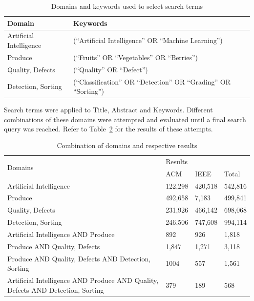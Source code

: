 \documentclass[conference]{IEEEtran}
\begin{document}
\begin{table}
	\caption{Domains and keywords used to select search terms}
	\label{tab:resdom}

	\begin{tabular}{ll}
	\hline
		Domain & Keywords \\
	\hline
		Artificial Intelligence & (``Artificial Intelligence'' OR ``Machine Learning'') \\
		Produce & (``Fruits'' OR ``Vegetables'' OR ``Berries'') \\
		Quality, Defects & (``Quality'' OR ``Defect'') \\
		Detection, Sorting & (``Classification'' OR ``Detection'' OR ``Grading'' OR ``Sorting'') \\
	\hline
	\end{tabular}
\end{table}

Search terms were applied to Title, Abstract and Keywords. Different combinations of these domains were attempted and evaluated until a final search query was reached. Refer to Table~\ref{tab:resres} for the results of these attempts.

\begin{table}[]
\caption{Combination of domains and respective results}
\label{tab:resres}
\begin{tabular}{llll}
\hline
\multirow{2}{*}{Domains}            & \multicolumn{3}{l}{Results} \\ \cline{2-4} 
                                    & ACM     & IEEE    & Total   \\ \hline
Artificial Intelligence             & 122,298 & 420,518 & 542,816 \\
Produce                             & 492,658 & 7,183   & 499,841 \\
Quality, Defects                    & 231,926 & 466,142 & 698,068 \\
Detection, Sorting                  & 246,506 & 747,608 & 994,114 \\
Artificial Intelligence AND Produce & 892     & 926     & 1,818   \\
Produce AND Quality, Defects        & 1,847   & 1,271   & 3,118   \\
Produce AND Quality, Defects AND Detection, Sorting                             & 1004 & 557 & 1,561 \\
Artificial Intelligence AND Produce AND Quality, Defects AND Detection, Sorting & 379  & 189 & 568   \\ \hline
\end{tabular}
\end{table}
\end{document}
